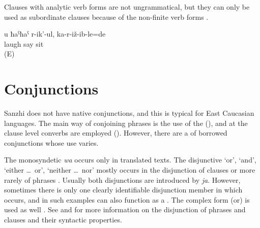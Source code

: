 Clauses with analytic verb forms are not ungrammatical, but they can only be used as subordinate clauses because of the non-finite verb forms .

\begin{exe}
	\ex	\label{ex:You sit and are laughing minor}
	\gll	u	ħaˁħaˁ	r-ik'-ul,	ka-r-iž-ib-le=de\\
			laugh	say	sit\\
	\glt	{} (E)
\end{exe}



\section{Conjunctions}
\label{sec:Conjunctions}

Sanzhi does not have native conjunctions, and this is typical for East Caucasian languages. The main way of conjoining phrases is the use of the  (), and at the clause level converbs are employed (). However, there are a  of borrowed conjunctions whose use varies.

The monosyndetic  \textit{wa}  occurs only in translated texts. The disjunctive   `or', `and', `either \ldots\ or', `neither \ldots\ nor' mostly occurs in the disjunction of clauses  or more rarely of phrases . Usually both disjunctions are introduced by \textit{ja}. However, sometimes there is only one clearly identifiable disjunction member in which  occurs, and in such examples  can also function as a  . The complex form  (or) is used as well . See  and  for more information on the disjunction of phrases and clauses and their syntactic properties.

